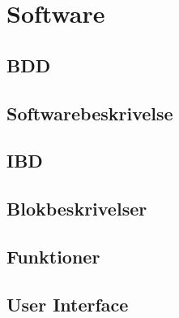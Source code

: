 \section{Software}

\subsection{BDD}
\subsection{Softwarebeskrivelse}
\subsection{IBD}
\subsection{Blokbeskrivelser}
\subsection{Funktioner}
\subsection{User Interface}